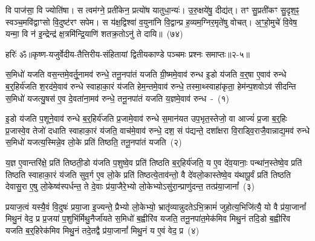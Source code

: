 वि पाज॑सा॒ वि ज्योति॑षा। स त्वम॑ग्ने॒ प्रती॑केन॒ प्रत्यो॑ष यातुधा॒न्यः॑। उ॒रु॒क्षये॑षु॒ दीद्य॑त्। तꣳ सु॒प्रती॑कꣳ सु॒दृश॒ꣴ॒ स्वञ्च॒मवि॑द्वाꣳसो वि॒दुष्ट॑रꣳ सपेम। स य॑क्ष॒द्विश्वा॑ व॒युना॑नि वि॒द्वान्प्र ह॒व्यम॒ग्निर॒मृते॑षु वोचत्। अ॒ꣳ॒हो॒मुचे॑ वि॒वेष॒ यन्मा॒ वि न॑ इ॒न्द्रेन्द्र॑ क्ष॒त्रमि॑न्द्रि॒याणि॑ शतक्र॒तो\-ऽनु॑ ते दायि॥~(७४)\ip

{\anuvakamend[{य॒ह्वीः सम॑ध्व॒राय॑ नो॒ वरु॑णꣳ राज॒ꣴ॒ श्चतु॑श्चत्वारिꣳशच्च}]}%

{हरिः॑ ॐ}{॥कृष्ण-यजुर्वेदीय-तैत्तिरीय-संहितायां द्वितीयकाण्डे पञ्चमः प्रश्नः समाप्तः॥२-५॥}

\setcounter{anuvakam}{0}
स॒मिधो॑ यजति वस॒न्तमे॒वर्तू॒नामव॑ रुन्धे॒ तनू॒नपा॑तं यजति ग्री॒ष्ममे॒वाव॑ रुन्ध इ॒डो य॑जति व॒र्॒\mbox{}षा ए॒वाव॑ रुन्धे ब॒र्॒\mbox{}हिर्य॑जति श॒रद॑मे॒वाव॑ रुन्धे स्वाहाका॒रं य॑जति हेम॒न्तमे॒वाव॑ रुन्धे॒ तस्मा॒थ्\-स्वाहा॑कृता॒ हेम॑न्प॒शवो\-ऽव॑ सीदन्ति स॒मिधो॑ यजत्यु॒षस॑ ए॒व दे॒वता॑ना॒मव॑ रुन्धे॒ तनू॒नपा॑तं यजति य॒ज्ञमे॒वाव॑ रुन्ध~-~(१)\ip

इ॒डो य॑जति प॒शूने॒वाव॑ रुन्धे ब॒र्॒\mbox{}हिर्य॑जति प्र॒जामे॒वाव॑ रुन्धे स॒मान॑यत उप॒भृत॒स्तेजो॒ वा आज्यं॑ प्र॒जा ब॒र्॒\mbox{}हिः प्र॒जास्वे॒व तेजो॑ दधाति स्वाहाका॒रं य॑जति॒ वाच॑मे॒वाव॑ रुन्धे॒ दश॒ सं प॑द्यन्ते॒ दशा᳚क्षरा वि॒राड्वि॒राजै॒वान्नाद्य॒मव॑ रुन्धे स॒मिधो॑ यजत्य॒स्मिन्ने॒व लो॒के प्रति॑ तिष्ठति॒ तनू॒नपा॑तं यजति~(२)\ip

य॒ज्ञ ए॒वान्तरि॑क्षे॒ प्रति॑ तिष्ठती॒डो य॑जति प॒शुष्वे॒व प्रति॑ तिष्ठति ब॒र्॒\mbox{}हिर्य॑जति॒ य ए॒व दे॑व॒यानाः॒ पन्था॑न॒स्तेष्वे॒व प्रति॑ तिष्ठति स्वाहाका॒रं य॑जति सुव॒र्ग ए॒व लो॒के प्रति॑ तिष्ठत्ये॒ताव॑न्तो॒ वै दे॑व\-लो॒का\-स्तेष्वे॒व य॑थापू॒र्वं प्रति॑ तिष्ठति देवासु॒रा ए॒षु लो॒केष्व॑स्पर्धन्त॒ ते दे॒वाः प्र॑या॒जैरे॒भ्यो लो॒केभ्यो\-ऽसु॑रा॒न्प्राणु॑दन्त॒ तत्प्र॑या॒जानां᳚~(३)\ip

प्रयाज॒त्वं यस्यै॒वं वि॒दुषः॑ प्रया॒जा इ॒ज्यन्ते॒ प्रैभ्यो लो॒केभ्यो॒ भ्रातृ॑व्यान्नुदते\-ऽभि॒क्रामं॑ जुहोत्य॒भिजि॑त्यै॒ यो वै प्र॑या॒जानां᳚ मिथु॒नं वेद॒ प्र प्र॒जया॑ प॒शुभि॑र्मिथु॒नैर्जा॑यते स॒मिधो॑ ब॒ह्वीरि॑व यजति॒ तनू॒नपा॑त॒मेक॑मिव मिथु॒नं तदि॒डो ब॒ह्वीरि॑व यजति ब॒र्॒\mbox{}हिरेक॑मिव मिथु॒नं तदे॒तद्वै प्र॑या॒जानां᳚ मिथु॒नं य ए॒वं वेद॒ प्र~(४)\ip

